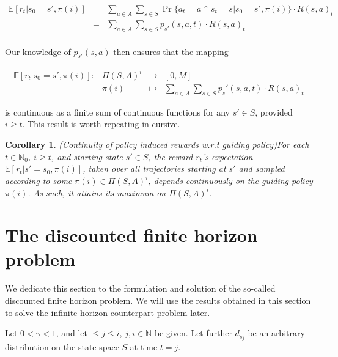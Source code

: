 \documentclass[11pt]{article} %
\newtheorem{cor}{Corollary}
\begin{document}
\begin{equation}\label{eqExpReward}
	\begin{array}{rcl}
		\mathbb{E}[r_t | s_0 = s', \pi(i)]	& = &	\sum\limits_{a \in A} \sum\limits_{s \in S} \Pr \{a_t = a \cap s_t = s | s_0 = s', \pi(i)\} \cdot R(s,a)_t \\
								& = &	\sum\limits_{a \in A} \sum\limits_{s \in S} p_{s'}(s,a,t) \cdot R(s,a)_t \\
	\end{array}
\end{equation}

Our knowledge of $p_{s'}(s,a)$ then ensures that the mapping

\begin{equation}\label{contExpRewMap}
	\begin{array}{rccl}
		\mathbb{E}[r_t | s_0 = s', \pi(i)]: 	& \Pi(S,A)^i 	& \rightarrow 	& [0,M] \\
									& \pi(i)				 		& \mapsto 	& \sum\limits_{a \in A} \sum\limits_{s \in S} p_s'(s,a,t) \cdot R(s,a)_t
	\end{array}
\end{equation}

is continuous as a finite sum of continuous functions for any $s' \in S$, provided $i \ge t$. This result is worth repeating in cursive.

\begin{cor}{(Continuity of policy induced rewards w.r.t guiding policy)}\label{corContinuousReward}
For each $t \in \mathbb{N}_0$, $i \ge t$, and starting state $s' \in S$, the reward $r_t$'s expectation $\mathbb{E}[r_t | s' = s_0, \pi(i)]$, taken over all trajectories starting at $s'$ and sampled according to some $\pi(i) \in \Pi(S,A)^i$, depends continuously on the guiding policy $\pi(i)$. As such, it attains its maximum on $\Pi(S,A)^i$.
\end{cor}

\section{The discounted finite horizon problem}

We dedicate this section to the formulation and solution of the so-called discounted finite horizon problem. We will use the results obtained in this section to solve the infinite horizon counterpart problem later.

Let $0 < \gamma < 1$, and let $\le j \le i$, $j,i \in \mathbb{N}$ be given. Let further $d_{s_j}$ be an arbitrary distribution on the state space $S$ at time $t = j$.
\end{document}
